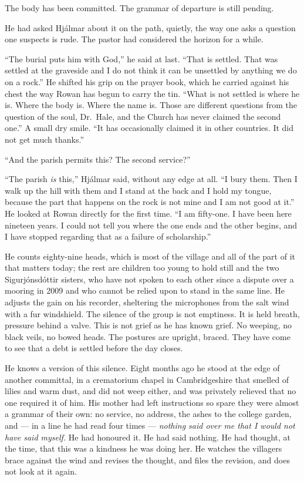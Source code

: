\documentclass[11pt,oneside]{book}
\begin{document}
The body has been committed. The grammar of departure is still pending.

He had asked Hjálmar about it on the path, quietly, the way one asks a
question one suspects is rude. The pastor had considered the horizon for
a while.

``The burial puts him with God,'' he said at last. ``That is settled.
That was settled at the graveside and I do not think it can be unsettled
by anything we do on a rock.'' He shifted his grip on the prayer book,
which he carried against his chest the way Rowan has begun to carry the
tin. ``What is not settled is where he is. Where the body is. Where the
name is. Those are different questions from the question of the soul,
Dr.~Hale, and the Church has never claimed the second one.'' A small dry
smile. ``It has occasionally claimed it in other countries. It did not
get much thanks.''

``And the parish permits this? The second service?''

``The parish \emph{is} this,'' Hjálmar said, without any edge at all.
``I bury them. Then I walk up the hill with them and I stand at the back
and I hold my tongue, because the part that happens on the rock is not
mine and I am not good at it.'' He looked at Rowan directly for the
first time. ``I am fifty-one. I have been here nineteen years. I could
not tell you where the one ends and the other begins, and I have stopped
regarding that as a failure of scholarship.''

He counts eighty-nine heads, which is most of the village and all of the
part of it that matters today; the rest are children too young to hold
still and the two Sigurjónsdóttir sisters, who have not spoken to each
other since a dispute over a mooring in 2009 and who cannot be relied
upon to stand in the same line. He adjusts the gain on his recorder,
sheltering the microphones from the salt wind with a fur windshield. The
silence of the group is not emptiness. It is held breath, pressure
behind a valve. This is not grief as he has known grief. No weeping, no
black veils, no bowed heads. The postures are upright, braced. They have
come to see that a debt is settled before the day closes.

He knows a version of this silence. Eight months ago he stood at the
edge of another committal, in a crematorium chapel in Cambridgeshire
that smelled of lilies and warm dust, and did not weep either, and was
privately relieved that no one required it of him. His mother had left
instructions so spare they were almost a grammar of their own: no
service, no address, the ashes to the college garden, and --- in a line
he had read four times --- \emph{nothing said over me that I would not
have said myself.} He had honoured it. He had said nothing. He had
thought, at the time, that this was a kindness he was doing her. He
watches the villagers brace against the wind and revises the thought,
and files the revision, and does not look at it again.
\end{document}
